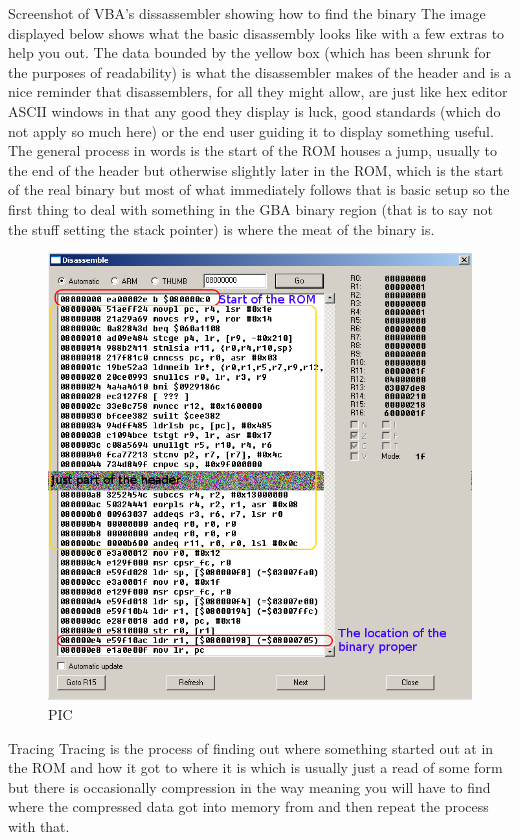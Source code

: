 \documentclass[
]{book}
\begin{document}
Screenshot of VBA's dissassembler showing how to find the binary The image displayed below shows what the basic disassembly looks like with a few extras to help you out. The data bounded by the yellow box (which has been shrunk for the purposes of readability) is what the disassembler makes of the header and is a nice reminder that disassemblers, for all they might allow, are just like hex editor ASCII windows in that any good they display is luck, good standards (which do not apply so much here) or the end user guiding it to display something useful. The general process in words is the start of the ROM houses a jump, usually to the end of the header but otherwise slightly later in the ROM, which is the start of the real binary but most of what immediately follows that is basic setup so the first thing to deal with something in the GBA binary region (that is to say not the stuff setting the stack pointer) is where the meat of the binary is.

\begin{figure}
\centering
\includegraphics{images/214_home_fast6191_romhackingguide_unrenamed_fil___borders_romhackingguidegbabinarylocationVBA.png}
\caption{PIC}
\end{figure}

Tracing Tracing is the process of finding out where something started out at in the ROM and how it got to where it is which is usually just a read of some form but there is occasionally compression in the way meaning you will have to find where the compressed data got into memory from and then repeat the process with that.
\end{document}
